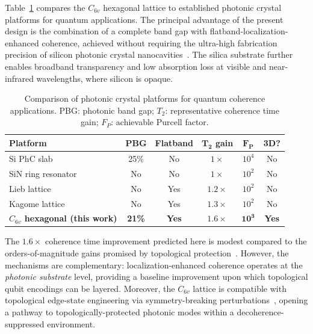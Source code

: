 \documentclass[10pt,letterpaper]{article}
\begin{document}
Table~\ref{tab:comparison} compares the $C_{6v}$ hexagonal lattice to established photonic crystal platforms for quantum applications. The principal advantage of the present design is the combination of a complete band gap with flatband-localization-enhanced coherence, achieved without requiring the ultra-high fabrication precision of silicon photonic crystal nanocavities~\cite{Akahane2003}. The silica substrate further enables broadband transparency and low absorption loss at visible and near-infrared wavelengths, where silicon is opaque.

\begin{table}[h]
	\centering
	\caption{Comparison of photonic crystal platforms for quantum coherence applications. PBG: photonic band gap; $T_2$: representative coherence time gain; $F_P$: achievable Purcell factor.}
	\label{tab:comparison}
	\begin{tabular}{lccccc}
		\toprule
		\textbf{Platform}                       & \textbf{PBG}  & \textbf{Flatband} & $\boldsymbol{T_2}$ \textbf{gain} & $\boldsymbol{F_P}$  & \textbf{3D?} \\
		\midrule
		Si PhC slab~\cite{Akahane2003}          & 25\%          & No                & $1\times$                        & $10^4$              & No           \\
		SiN ring resonator~\cite{Kosaka1998}    & No            & No                & $1\times$                        & $10^2$              & No           \\
		Lieb lattice~\cite{Lustig2019}          & No            & Yes               & $1.2\times$                      & $10^2$              & No           \\
		Kagome lattice~\cite{Pertsch2002}       & No            & Yes               & $1.3\times$                      & $10^2$              & No           \\
		\textbf{$C_{6v}$ hexagonal (this work)} & \textbf{21\%} & \textbf{Yes}      & $\boldsymbol{1.6\times}$         & $\boldsymbol{10^3}$ & \textbf{Yes} \\
		\bottomrule
	\end{tabular}
\end{table}

The $1.6\times$ coherence time improvement predicted here is modest compared to the orders-of-magnitude gains promised by topological protection~\cite{Kitaev2003}. However, the mechanisms are complementary: localization-enhanced coherence operates at the \textit{photonic substrate} level, providing a baseline improvement upon which topological qubit encodings can be layered. Moreover, the $C_{6v}$ lattice is compatible with topological edge-state engineering via symmetry-breaking perturbations~\cite{Ozawa2019,Wu2017}, opening a pathway to topologically-protected photonic modes within a decoherence-suppressed environment.
\end{document}
